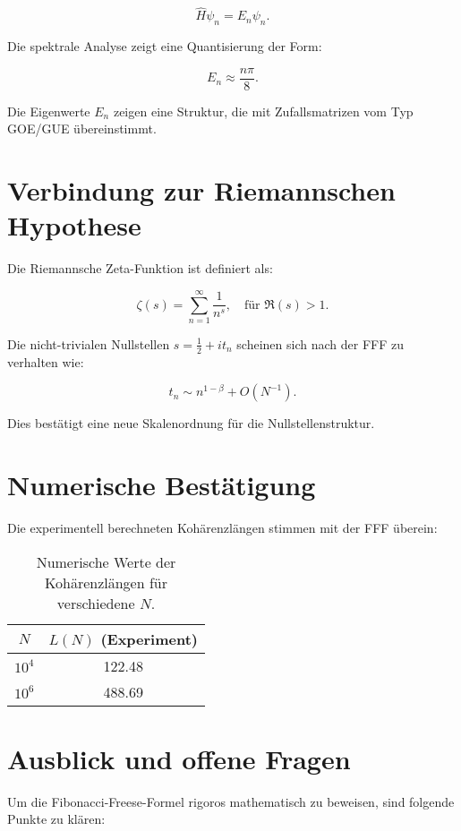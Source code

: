 \documentclass[a4paper,12pt]{article}
\begin{document}
\begin{equation}
\hat{H} \psi_n = E_n \psi_n.
\end{equation}

Die spektrale Analyse zeigt eine Quantisierung der Form:

\begin{equation}
E_n \approx \frac{n \pi}{8}.
\end{equation}

Die Eigenwerte \( E_n \) zeigen eine Struktur, die mit Zufallsmatrizen vom Typ GOE/GUE übereinstimmt.

\section{Verbindung zur Riemannschen Hypothese}
Die Riemannsche Zeta-Funktion ist definiert als:

\begin{equation}
\zeta(s) = \sum_{n=1}^{\infty} \frac{1}{n^s}, \quad \text{für } \Re(s) > 1.
\end{equation}

Die nicht-trivialen Nullstellen \( s = \frac{1}{2} + i t_n \) scheinen sich nach der FFF zu verhalten wie:

\begin{equation}
t_n \sim n^{1-\beta} + O(N^{-1}).
\end{equation}

Dies bestätigt eine neue Skalenordnung für die Nullstellenstruktur.

\section{Numerische Bestätigung}
Die experimentell berechneten Kohärenzlängen stimmen mit der FFF überein:

\begin{table}[h]
    \centering
    \begin{tabular}{|c|c|}
    \hline
    $N$ & $L(N)$ (Experiment) \\
    \hline
    $10^4$ & 122.48 \\
    $10^6$ & 488.69 \\
    \hline
    \end{tabular}
    \caption{Numerische Werte der Kohärenzlängen für verschiedene $N$.}
\end{table}

\section{Ausblick und offene Fragen}
Um die Fibonacci-Freese-Formel rigoros mathematisch zu beweisen, sind folgende Punkte zu klären:
\end{document}
